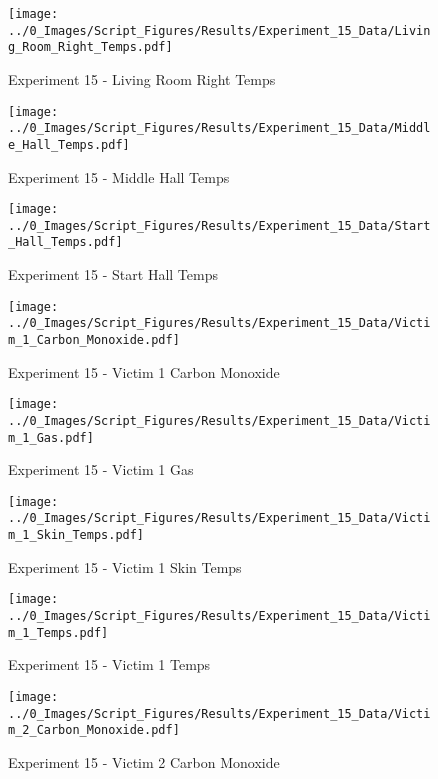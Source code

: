 	\clearpage

	\begin{figure}[H]
		\centering
		\texttt{[image: ../0\_Images/Script\_Figures/Results/Experiment\_15\_Data/Living\_Room\_Right\_Temps.pdf]}
		\caption[]{Experiment 15 - Living Room Right Temps}
	\end{figure}
 

	\begin{figure}[H]
		\centering
		\texttt{[image: ../0\_Images/Script\_Figures/Results/Experiment\_15\_Data/Middle\_Hall\_Temps.pdf]}
		\caption[]{Experiment 15 - Middle Hall Temps}
	\end{figure}
 
	\clearpage

	\begin{figure}[H]
		\centering
		\texttt{[image: ../0\_Images/Script\_Figures/Results/Experiment\_15\_Data/Start\_Hall\_Temps.pdf]}
		\caption[]{Experiment 15 - Start Hall Temps}
	\end{figure}
 

	\begin{figure}[H]
		\centering
		\texttt{[image: ../0\_Images/Script\_Figures/Results/Experiment\_15\_Data/Victim\_1\_Carbon\_Monoxide.pdf]}
		\caption[]{Experiment 15 - Victim 1 Carbon Monoxide}
	\end{figure}
 
	\clearpage

	\begin{figure}[H]
		\centering
		\texttt{[image: ../0\_Images/Script\_Figures/Results/Experiment\_15\_Data/Victim\_1\_Gas.pdf]}
		\caption[]{Experiment 15 - Victim 1 Gas}
	\end{figure}
 

	\begin{figure}[H]
		\centering
		\texttt{[image: ../0\_Images/Script\_Figures/Results/Experiment\_15\_Data/Victim\_1\_Skin\_Temps.pdf]}
		\caption[]{Experiment 15 - Victim 1 Skin Temps}
	\end{figure}
 
	\clearpage

	\begin{figure}[H]
		\centering
		\texttt{[image: ../0\_Images/Script\_Figures/Results/Experiment\_15\_Data/Victim\_1\_Temps.pdf]}
		\caption[]{Experiment 15 - Victim 1 Temps}
	\end{figure}
 

	\begin{figure}[H]
		\centering
		\texttt{[image: ../0\_Images/Script\_Figures/Results/Experiment\_15\_Data/Victim\_2\_Carbon\_Monoxide.pdf]}
		\caption[]{Experiment 15 - Victim 2 Carbon Monoxide}
	\end{figure}
 
